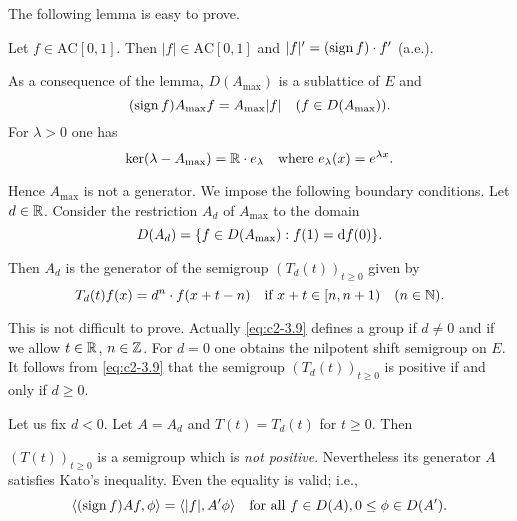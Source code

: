 The following lemma is easy to prove.

\begin{lemma}\label{lem:c2-3.14}
Let $f \in \text{AC}[0,1]$. 
Then $|f| \in \text{AC}[0,1]$ and $|f|' = (\operatorname{sign}  f) \cdot f'$ (a.e.).
\end{lemma}

As a consequence of the lemma, $D(A_{\max})$ is a sublattice of $E$ and
\begin{equation}\label{eq:c2-3.7}
(\operatorname{sign}  f)A_{\max}f = A_{\max}|f| \quad (f \in D(A_{\max})).
\end{equation}
For $\lambda > 0$ one has
\begin{equation}\label{eq:c2-3.8}
\text{ker}(\lambda - A_{\max}) = \mathbb{R} \cdot e_{\lambda} \quad \text{where }  e_{\lambda}(x) = e^{\lambda x}.
\end{equation}

Hence $A_{\max}$ is not a generator. 
We impose the following boundary conditions.
Let $d \in \mathbb{R}$. 
Consider the restriction $A_{d}$ of $A_{\max}$ to the domain
\begin{equation*}
D(A_{d}) = \{f \in D(A_{\max}) : f(1) = \mathop{}\!\mathrm{d}{}f(0)\}.
\end{equation*}

Then $A_{d}$ is the generator of the semigroup $(T_{d}(t))_{t \geq 0}$ given by
\begin{equation}\label{eq:c2-3.9}
T_{d}(t)f(x) = d^{n} \cdot f(x+t-n) \quad \text{if } x+t \in [n, n+1) \quad (n \in \mathbb{N} ).
\end{equation}

This is not difficult to prove. 
Actually \eqref{eq:c2-3.9} defines a group if $d \neq 0$ and if we allow $t \in \mathbb{R}$, $n \in \mathbb{Z} $. For $d = 0$ one obtains the nilpotent shift semigroup on $E$.
It follows from \eqref{eq:c2-3.9} that the semigroup $(T_{d}(t))_{t \geq 0}$ is positive if and only if $d \geq 0$.

Let us fix $d < 0$. Let $A = A_{d}$ and $T(t) = T_{d}(t)$ for $t \geq 0$. Then

$(T(t))_{t \geq 0}$ is a semigroup which is \emph{not positive}. Nevertheless its generator $A$ satisfies Kato's inequality. Even the equality is valid;
i.e.,
\begin{equation}\label{eq:c2-3.10}
\langle(\operatorname{sign}  f) Af,\phi\rangle = \langle|f|,A'\phi \rangle \quad \text{for all } f \in D(A), 0 \leq \phi \in D(A').
\end{equation}

